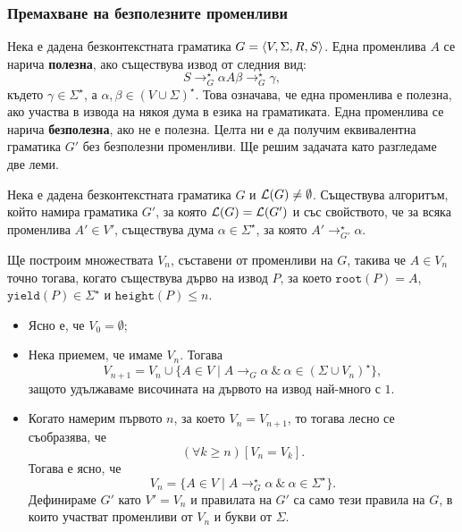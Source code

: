 \subsubsection*{Премахване на безполезните променливи}

Нека е дадена безконтекстната граматика $G = \langle{V,\Sigma,R,S}\rangle$.
Една променлива $A$ се нарича {\bf полезна}, ако съществува извод от следния вид:
\[S \to^\star_G \alpha A \beta \to^\star_G \gamma,\]
където $\gamma \in \Sigma^\star$, а $\alpha,\beta \in (V \cup \Sigma)^\star$.
Това означава, че една променлива е полезна, ако участва в извода на някоя дума в езика на граматиката.
Една променлива се нарича {\bf безполезна}, ако не е полезна.
Целта ни е да получим еквивалентна граматика $G'$ без безполезни променливи.
Ще решим задачата като разгледаме две леми.

\begin{lemma}
  \label{lem:useless1}
  Нека е дадена безконтекстната граматика $G$ и $\mathcal{L}(G) \neq \emptyset$.
  Съществува алгоритъм, който намира граматика $G'$, за която
  $\mathcal{L}(G) = \mathcal{L}(G')$ и със свойството, че  за всяка променлива $A' \in V'$, съществува дума $\alpha \in \Sigma^\star$,
  за която $A' \to^\star_{G'} \alpha$.
\end{lemma}
\begin{hint}
  Ще построим множествата $V_n$, съставени от променливи на $G$, такива че
  $A \in V_n$ точно тогава, когато съществува дърво на извод $P$, за което
  $\texttt{root}(P) = A$, $\texttt{yield}(P) \in \Sigma^\star$ и $\texttt{height}(P) \leq n$.
  
  \begin{itemize}
  \item
    Ясно е, че $V_0 = \emptyset$;
  \item
    Нека приемем, че имаме $V_n$. Тогава
    \[V_{n+1} = V_n \cup \{A\in V \mid A \to_G \alpha\ \&\ \alpha \in (\Sigma \cup V_n)^\star \},\]
    защото удължаваме височината на дървото на извод най-много с $1$.
  \item
    Когато намерим първото $n$, за което $V_n = V_{n+1}$, то тогава лесно се съобразява, че
    \[(\forall k \geq n)[V_n = V_k].\]
    Тогава е ясно, че
    \[V_n = \{A \in V \mid A \to^\star_G \alpha\ \&\ \alpha \in \Sigma^\star \}.\]
    Дефинираме $G'$ като $V' = V_n$ и правилата на $G'$ са само тези правила на $G$, в които участват променливи от $V_n$ и букви от $\Sigma$.
  \end{itemize}
\end{hint}

